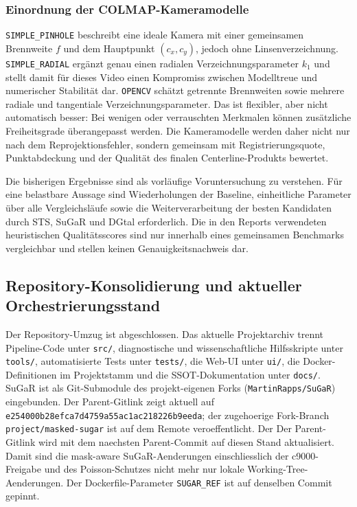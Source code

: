\documentclass[12pt,a4paper]{article}
\begin{document}
\subsubsection{Einordnung der COLMAP-Kameramodelle}
\texttt{SIMPLE\_PINHOLE} beschreibt eine ideale Kamera mit einer gemeinsamen
Brennweite $f$ und dem Hauptpunkt $(c_x,c_y)$, jedoch ohne
Linsenverzeichnung. \texttt{SIMPLE\_RADIAL} ergänzt genau einen radialen
Verzeichnungsparameter $k_1$ und stellt damit für dieses Video einen
Kompromiss zwischen Modelltreue und numerischer Stabilität dar.
\texttt{OPENCV} schätzt getrennte Brennweiten sowie mehrere radiale und
tangentiale Verzeichnungsparameter. Das ist flexibler, aber nicht automatisch
besser: Bei wenigen oder verrauschten Merkmalen können zusätzliche
Freiheitsgrade überangepasst werden. Die Kameramodelle werden daher nicht nur
nach dem Reprojektionsfehler, sondern gemeinsam mit Registrierungsquote,
Punktabdeckung und der Qualität des finalen Centerline-Produkts bewertet.

Die bisherigen Ergebnisse sind als vorläufige Voruntersuchung zu verstehen.
Für eine belastbare Aussage sind Wiederholungen der Baseline, einheitliche
Parameter über alle Vergleichsläufe sowie die Weiterverarbeitung der besten
Kandidaten durch STS, SuGaR und DGtal erforderlich. Die in den Reports
verwendeten heuristischen Qualitätsscores sind nur innerhalb eines gemeinsamen
Benchmarks vergleichbar und stellen keinen Genauigkeitsnachweis dar.

\subsection{Repository-Konsolidierung und aktueller Orchestrierungsstand}
Der Repository-Umzug ist abgeschlossen. Das aktuelle Projektarchiv trennt
Pipeline-Code unter \texttt{src/}, diagnostische und wissenschaftliche
Hilfsskripte unter \texttt{tools/}, automatisierte Tests unter
\texttt{tests/}, die Web-UI unter \texttt{ui/}, die Docker-Definitionen im
Projektstamm und die SSOT-Dokumentation unter \texttt{docs/}. SuGaR ist als
Git-Submodule des projekt-eigenen Forks
(\texttt{MartinRapps/SuGaR}) eingebunden. Der Parent-Gitlink zeigt aktuell auf
\texttt{e254000b28efca7d4759a55ac1ac218226b9eeda}; der zugehoerige Fork-Branch
\texttt{project/masked-sugar} ist auf dem Remote veroeffentlicht. Der
Der Parent-Gitlink wird mit dem naechsten Parent-Commit auf diesen Stand
aktualisiert. Damit sind die mask-aware SuGaR-Aenderungen
einschliesslich der c9000-Freigabe und des Poisson-Schutzes nicht mehr nur
lokale Working-Tree-Aenderungen. Der Dockerfile-Parameter \texttt{SUGAR\_REF}
ist auf denselben Commit gepinnt.
\end{document}
